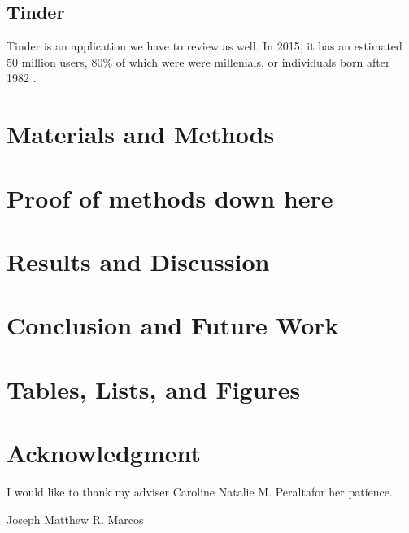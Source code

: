 \documentclass[journal]{./IEEE/IEEEtran}
\newcommand{\ADVISEE}{Joseph Matthew R. Marcos}
\newcommand{\ADVISER}{Caroline Natalie M. Peralta}
\begin{document}
\subsection{Tinder}
Tinder is an application we have to review as well. In 2015, it has an estimated 50 million users\cite{tinderstat2}, 80\% of which were were millenials, or individuals born after 1982 \cite{tinderstat}\cite{millenial}.


\section{Materials and Methods}
\section{Proof of methods down here}

\section{Results and Discussion}

\section{Conclusion and Future Work}

\appendices



\newpage
\section{Tables, Lists, and Figures}
\newpage
\section*{Acknowledgment}
I would like to thank my adviser \ADVISER for her patience.

\begin{biography}{\ADVISEE}
\end{biography}


\newpage
% 


\end{document}
